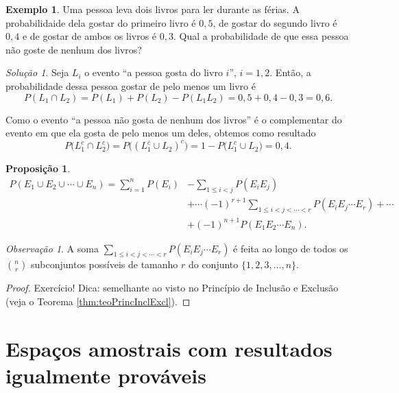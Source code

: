 \documentclass[]{book}
\newtheorem{proposition}{Proposição}[chapter]
\theoremstyle{definition}
\theoremstyle{definition}
\newtheorem{example}{Exemplo}[chapter]
\theoremstyle{definition}
\theoremstyle{remark}
\newtheorem*{remark}{Observação}
\newtheorem*{solution}{Solução}
\begin{document}
\begin{example}
\protect\hypertarget{exm:unnamed-chunk-126}{}{\label{exm:unnamed-chunk-126} }Uma pessoa leva dois livros para ler durante as férias.
A probabilidaide dela gostar do primeiro livro é \(0{,}5\), de gostar do segundo livro é \(0{,}4\) e de gostar de ambos os livros é \(0{,}3\).
Qual a probabilidade de que essa pessoa não goste de nenhum dos livros?
\end{example}

\begin{solution}
\iffalse{} {Solução. } \fi{}Seja \(L_i\) o evento ``a pessoa gosta do livro \(i\)'', \(i=1,2\).
Então, a probabilidade dessa pessoa gostar de pelo menos um livro é
\[P(L_1 \cap L_2) = P(L_1) + P(L_2) - P(L_1L_2) = 0{,}5+0{,}4-0{,}3=0{,}6.\]

Como o evento ``a pessoa não gosta de nenhum dos livros'' é o complementar do evento em que ela gosta de pelo menos um deles, obtemos como resultado
\[P\big(L_1^c \cap L_2^c\big) = P\big((L_1^c \cup L_2)^c\big) = 1 - P\big(L_1^c \cup L_2\big) = 0{,}4.\]
\end{solution}

\begin{proposition}
\protect\hypertarget{prp:propInclusaoExclusao}{}{\label{prp:propInclusaoExclusao} }\begin{align}
P(E_1\cup E_2 \cup\cdots\cup E_n) = \sum_{i=1}^{n}P(E_i) &- \sum_{1\leq i <j}P(E_i E_j) \\
&+ \cdots (-1)^{r+1}\sum_{1\leq i <j<\cdots<r}^{}P(E_i E_j \cdots E_r) +\cdots  \\
&+(-1)^{n+1}P(E_1 E_2 \cdots E_n).
\end{align}
\end{proposition}

\begin{remark}
\iffalse{} {Observação. } \fi{}A soma \(\sum_{1\leq i <j<\cdots<r}^{}P(E_i E_j \cdots E_r)\) é feita ao longo de todos os \({n \choose r}\) subconjuntos possíveis de tamanho \(r\) do conjunto \(\{1,2,3,\ldots, n\}.\)
\end{remark}

\begin{proof}
\iffalse{} {Prova. } \fi{}Exercício!
Dica: semelhante ao visto no Princípio de Inclusão e Exclusão (veja o Teorema \ref{thm:teoPrincInclExcl}).
\end{proof}

\hypertarget{espauxe7os-amostrais-com-resultados-igualmente-provuxe1veis}{%
\section{Espaços amostrais com resultados igualmente prováveis}\label{espauxe7os-amostrais-com-resultados-igualmente-provuxe1veis}}
\end{document}
